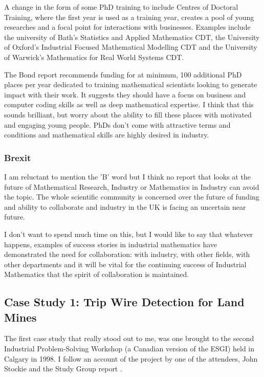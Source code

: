 \documentclass[11pt]{article} %
\begin{document}
A change in the form of  some PhD training to include Centres of Doctoral Training, where the first year is used as a training year,  creates a pool of young researches and a focal point for interactions with businesses. Examples include the university of Bath's Statistics and Applied Mathematics CDT, the University of Oxford's Industrial Focused Mathematical Modelling CDT and the University of Warwick's  Mathematics for Real World Systems CDT. 

The Bond report \cite{Bond} recommends funding for at minimum, 100 additional PhD places per year dedicated to training mathematical scientists looking to generate impact with their work. It suggests they should have a focus on business and computer coding skills as well as deep mathematical expertise. I think that this sounds brilliant, but worry about the ability to fill these places with motivated and engaging young people. PhDs don't come with attractive terms and conditions and mathematical skills are highly desired in industry. 




	
	
	
	
	\subsubsection{Brexit}
	I am reluctant to mention the 'B' word but I think no report that looks at the future of Mathematical Research, Industry or Mathematics in Industry can avoid the topic. The whole scientific community is concerned over the future of funding and ability to collaborate \cite{Owens2018}  and industry in the UK is facing an uncertain near future.
	
	I don't want to spend much time on this, but I would like to say that whatever happens, examples of success stories in industrial mathematics have demonstrated the need for collaboration: with industry, with other fields, with other departments and it will be vital for the continuing success of Industrial Mathematics that the spirit of collaboration is maintained. 
	
	\subsection{Case Study 1: Trip Wire Detection for Land Mines \label{landmines}}
	
	The first case study that really stood out to me, was one brought to the second Industrial Problem-Solving Workshop (a Canadian version of the ESGI) held in Calgary in 1998. I follow an account of the project by one of the attendees, John Stockie \cite{Stockie2015} and the Study Group report \cite{Jessop}.
	
\end{document}

